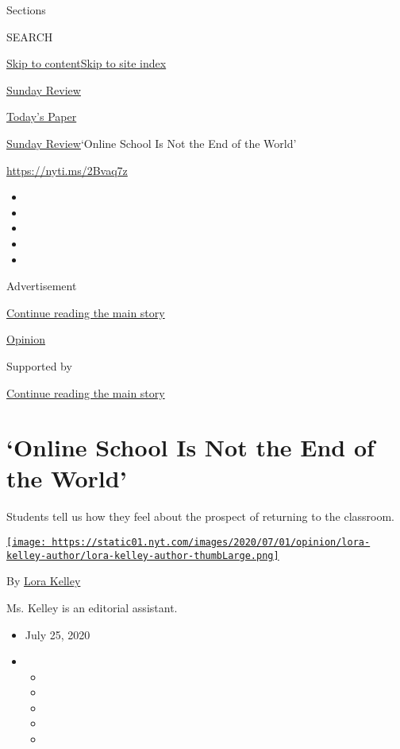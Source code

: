 Sections

SEARCH

\protect\hyperlink{site-content}{Skip to
content}\protect\hyperlink{site-index}{Skip to site index}

\href{https://www.nytimes.com/section/opinion/sunday}{Sunday Review}

\href{https://myaccount.nytimes.com/auth/login?response_type=cookie\&client_id=vi}{}

\href{https://www.nytimes.com/section/todayspaper}{Today's Paper}

\href{/section/opinion/sunday}{Sunday Review}\textbar{}`Online School Is
Not the End of the World'

\url{https://nyti.ms/2Bvaq7z}

\begin{itemize}
\item
\item
\item
\item
\item
\end{itemize}

Advertisement

\protect\hyperlink{after-top}{Continue reading the main story}

\href{/section/opinion}{Opinion}

Supported by

\protect\hyperlink{after-sponsor}{Continue reading the main story}

\hypertarget{online-school-is-not-the-end-of-the-world}{%
\section{`Online School Is Not the End of the
World'}\label{online-school-is-not-the-end-of-the-world}}

Students tell us how they feel about the prospect of returning to the
classroom.

\href{https://www.nytimes.com/by/lora-kelley}{\texttt{[image: https://static01.nyt.com/images/2020/07/01/opinion/lora-kelley-author/lora-kelley-author-thumbLarge.png]}}

By \href{https://www.nytimes.com/by/lora-kelley}{Lora Kelley}

Ms. Kelley is an editorial assistant.

\begin{itemize}
\item
  July 25, 2020
\item
  \begin{itemize}
  \item
  \item
  \item
  \item
  \item
  \end{itemize}
\end{itemize}

